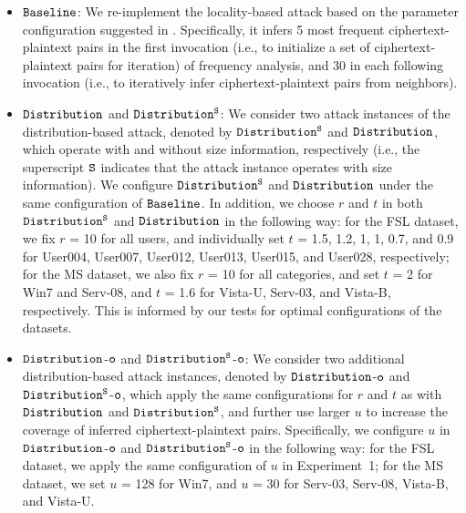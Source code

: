 \begin{itemize}[leftmargin=*]
\item 
$\tt Baseline$: We re-implement the locality-based attack based on the parameter configuration suggested in \cite{li17}. Specifically, it infers 5 most frequent ciphertext-plaintext pairs in the first invocation (i.e., to initialize a set of ciphertext-plaintext pairs for iteration) of frequency analysis, and 30 in each following invocation (i.e., to iteratively infer ciphertext-plaintext pairs from neighbors).  
\item 
$\tt Distribution$ and $\tt Distribution^S$: We consider two attack instances of the distribution-based attack, denoted by $\tt Distribution^S$ and ${\tt Distribution}$, which operate with and without size information, respectively (i.e., the superscript $\tt S$ indicates that the attack instance operates with size information). We configure $\tt Distribution^S$ and ${\tt Distribution}$ under the same configuration of  ${\tt Baseline}$. In addition, we choose $r$ and $t$ in both  $\tt Distribution^S$ and ${\tt Distribution}$ in the following way: for the FSL dataset, we fix $r$ = 10 for all users, and individually set $t$ = 1.5, 1.2, 1, 1, 0.7, and 0.9 for User004, User007, User012, User013, User015, and User028, respectively; for the MS dataset, we also fix $r$ = 10 for all categories, and set $t$ = 2 for Win7 and Serv-08, and $t$ = 1.6 for Vista-U, Serv-03, and Vista-B, respectively. This is informed by our tests for optimal configurations of the datasets.   
\item 
$\tt Distribution$-$\tt o$ and $\tt Distribution^S$-$\tt o$: We consider two additional distribution-based attack instances, denoted by $\tt Distribution$-$\tt o$ and $\tt Distribution^S$-$\tt o$, which apply the same configurations for $r$ and $t$ as with $\tt Distribution$ and $\tt Distribution^S$, and further use larger $u$ to increase the coverage of inferred ciphertext-plaintext pairs.  Specifically, we configure $u$ in $\tt Distribution$-$\tt o$ and $\tt Distribution^S$-$\tt o$ in the following way:  for the FSL dataset, we apply the same configuration of $u$ in Experiment~1; for the MS dataset, we set $u$ = 128 for Win7, and $u$ = 30 for Serv-03, Serv-08, Vista-B, and Vista-U. 

\end{itemize}

